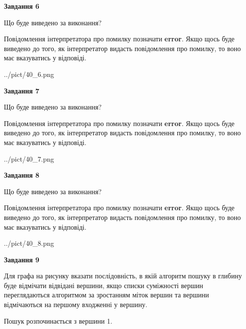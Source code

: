 \documentclass[12pt, ukrainian]{article}
\begin{document}
{\begin {large}
{\begin {center}\textbf{Завдання 6}\end {center}}\par
Що буде виведено за виконання?

Повідомлення інтерпретатора про помилку позначати \textbf{error}.
Якщо щось буде виведено до того, як інтерпретатор видасть повідомлення про помилку, 
то воно має вказуватись у відповіді. \par


\begin{center}
	{../pict/40_6.png}
\end{center}
\newpage

{\begin {center}\textbf{Завдання 7}\end {center}}\par
Що буде виведено за виконання?

Повідомлення інтерпретатора про помилку позначати \textbf{error}.
Якщо щось буде виведено до того, як інтерпретатор видасть повідомлення про помилку, 
то воно має вказуватись у відповіді. \par


\begin{center}
	{../pict/40_7.png}
\end{center}
\newpage

{\begin {center}\textbf{Завдання 8}\end {center}}\par
Що буде виведено за виконання?

Повідомлення інтерпретатора про помилку позначати \textbf{error}.
Якщо щось буде виведено до того, як інтерпретатор видасть повідомлення про помилку, 
то воно має вказуватись у відповіді. \par


\begin{center}
	{../pict/40_8.png}
\end{center}
\newpage

{\begin {center}\textbf{Завдання 9}\end {center}}\par
Для графа на рисунку вказати послідовність, в якій алгоритм пошуку в глибину буде відмічати відвідані вершини, якщо списки суміжності вершин переглядаються алгоритмом за зростанням міток вершин та вершини відмічаються на першому вход\-женні у вершину.\par
Пошук розпочинається з вершини 1.\par


\end{large}}
\end{document}
